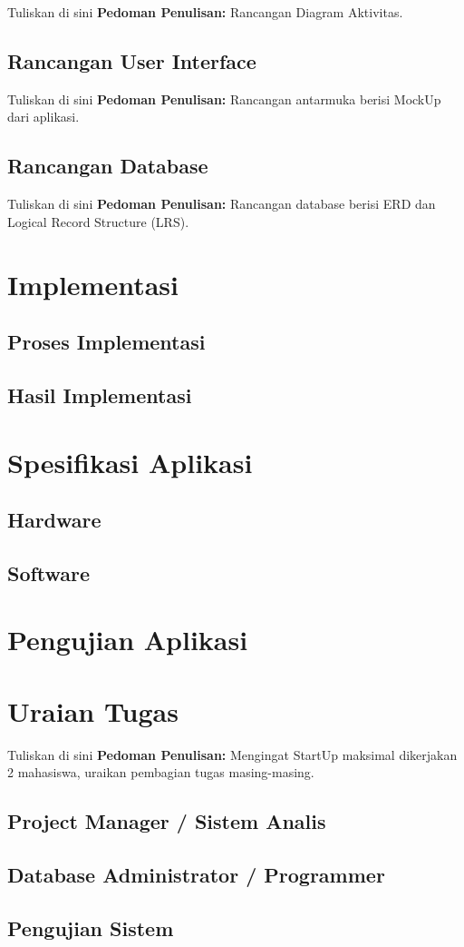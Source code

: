 Tuliskan di sini \textbf{Pedoman Penulisan:} Rancangan Diagram Aktivitas.


\subsection{Rancangan User Interface}


Tuliskan di sini \textbf{Pedoman Penulisan:} Rancangan antarmuka berisi MockUp dari aplikasi.


\subsection{Rancangan Database}


Tuliskan di sini \textbf{Pedoman Penulisan:} Rancangan database berisi ERD dan Logical Record Structure (LRS).


\section{Implementasi}
\subsection{Proses Implementasi}
\subsection{Hasil Implementasi}
\section{Spesifikasi Aplikasi}
\subsection{Hardware}
\subsection{Software}
\section{Pengujian Aplikasi}
\section{Uraian Tugas}


Tuliskan di sini \textbf{Pedoman Penulisan:} Mengingat StartUp maksimal dikerjakan 2 mahasiswa, uraikan pembagian tugas masing-masing.


\subsection{Project Manager / Sistem Analis}
\subsection{Database Administrator / Programmer}
\subsection{Pengujian Sistem}
